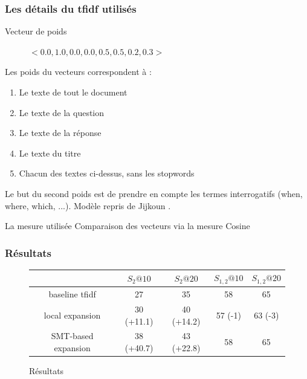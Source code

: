 \documentclass[10pt]{beamer}
\begin{document}
\begin{frame}
  \frametitle{Les détails du tfidf utilisés}

  \begin{block}{Vecteur de poids}
    \begin{figure}[h]
      \centering
      $<0.0, 1.0, 0.0, 0.0, 0.5, 0.5, 0.2, 0.3>$
    \end{figure}
    
    
    Les poids du vecteurs correspondent à :

    \begin{enumerate}
    \item Le texte de tout le document
    \item Le texte de la question
    \item Le texte de la réponse
    \item Le texte du titre
    \item Chacun des textes ci-dessus, sans les stopwords
    \end{enumerate}

    Le but du second poids est de prendre en compte les termes
    interrogatifs (when, where, which, ...). Modèle repris de Jijkoun
    \cite{Jijkoun05}.

  \end{block}
  \pause
  \begin{block}{La mesure utilisée}
    Comparaison des vecteurs via la mesure Cosine
  \end{block}

\end{frame}

\begin{frame}
  \frametitle{Résultats}
  \begin{figure}[h]
    \centering
    \begin{tabular}[h]{|c|c|c|c|c|}
    \hline
    & $S_2@10$ & $S_2@20$ & $S_{1,2}@10$ & $S_{1,2}@20$\\
    \hline
    baseline tfidf & 27 & 35 & 58 & 65\\
    local expansion & 30 (+11.1) & 40 (+14.2) & 57 (-1) & 63 (-3)\\
    SMT-based expansion & 38 (+40.7) & 43 (+22.8) & 58 & 65\\
    \hline
  \end{tabular}

    \caption{Résultats}
    \label{fig:res}
  \end{figure}

\end{frame}
\end{document}
